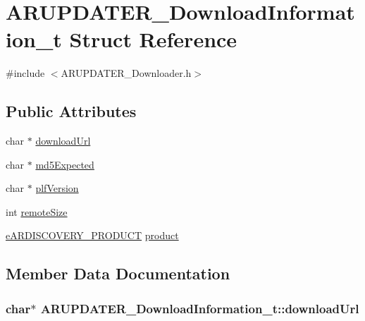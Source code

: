 \hypertarget{struct_a_r_u_p_d_a_t_e_r___download_information__t}{}\section{A\+R\+U\+P\+D\+A\+T\+E\+R\+\_\+\+Download\+Information\+\_\+t Struct Reference}
\label{struct_a_r_u_p_d_a_t_e_r___download_information__t}


{\ttfamily \#include $<$A\+R\+U\+P\+D\+A\+T\+E\+R\+\_\+\+Downloader.\+h$>$}

\subsection*{Public Attributes}
\begin{DoxyCompactItemize}
\item 
char $\ast$ \hyperlink{struct_a_r_u_p_d_a_t_e_r___download_information__t_a114d8cdf44425b0ef75431bd715ddcc5}{download\+Url}
\item 
char $\ast$ \hyperlink{struct_a_r_u_p_d_a_t_e_r___download_information__t_affe7d446a0e230d0449dfc06d5cd53bb}{md5\+Expected}
\item 
char $\ast$ \hyperlink{struct_a_r_u_p_d_a_t_e_r___download_information__t_a3a94cf628daa8cd3560f5ec4d261f6b5}{plf\+Version}
\item 
int \hyperlink{struct_a_r_u_p_d_a_t_e_r___download_information__t_a549098f9598aaaa33cf020ac36d25cb7}{remote\+Size}
\item 
\hyperlink{_a_r_d_i_s_c_o_v_e_r_y___discovery_8h_a908972407587656a48194c58ccd65813}{e\+A\+R\+D\+I\+S\+C\+O\+V\+E\+R\+Y\+\_\+\+P\+R\+O\+D\+U\+CT} \hyperlink{struct_a_r_u_p_d_a_t_e_r___download_information__t_a94e99e2b9d5fc1e53bb116af4b6b1ea2}{product}
\end{DoxyCompactItemize}


\subsection{Member Data Documentation}
\subsubsection[{\texorpdfstring{download\+Url}{downloadUrl}}]{\setlength{\rightskip}{0pt plus 5cm}char$\ast$ A\+R\+U\+P\+D\+A\+T\+E\+R\+\_\+\+Download\+Information\+\_\+t\+::download\+Url}\hypertarget{struct_a_r_u_p_d_a_t_e_r___download_information__t_a114d8cdf44425b0ef75431bd715ddcc5}{}\label{struct_a_r_u_p_d_a_t_e_r___download_information__t_a114d8cdf44425b0ef75431bd715ddcc5}
